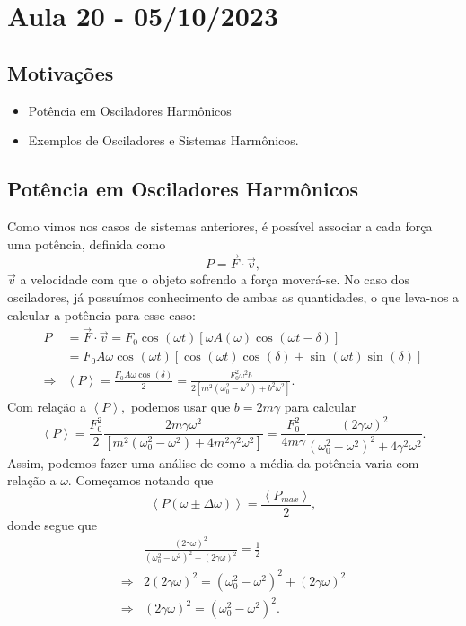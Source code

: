 \documentclass[PhysicsII/physicsII_notes.tex]{subfiles}
\begin{document}
\section{Aula 20 - 05/10/2023}
\subsection{Motivações}
\begin{itemize}
	\item Potência em Osciladores Harmônicos
	\item Exemplos de Osciladores e Sistemas Harmônicos.
\end{itemize}
\subsection{Potência em Osciladores Harmônicos}
Como vimos nos casos de sistemas anteriores, é possível associar a cada força uma potência, definida como
\[
	P = \vec{F}\cdot \vec{v},
\]
\(\vec{v}\) a velocidade com que o objeto sofrendo a força moverá-se. No caso dos osciladores, já possuímos conhecimento
de ambas as quantidades, o que leva-nos a calcular a potência para esse caso:
\begin{align*}
	P           & = \vec{F}\cdot \vec{v} = F_{0}\cos^{}{(\omega t)}[\omega A(\omega )\cos^{}{(\omega t-\delta )}]                                                 \\
	            & =F_{0}A\omega \cos^{}{(\omega t)}[\cos^{}{(\omega t)}\cos^{}{(\delta )} + \sin^{}{(\omega t)}\sin^{}{(\delta )}]                                \\
	\Rightarrow & \left< P\right> = \frac{F_{0}A\omega \cos^{}{(\delta )}}{2} = \frac{F_{0}^{2}\omega^{2}b}{2[m^{2}(\omega_{0}^{2}-\omega^{2})+b^{2}\omega^{2}]}.
\end{align*}
Com relação a \(\left< P \right>,\) podemos usar que \(b = 2m\gamma \) para calcular
\[
	\left< P \right> = \frac{F_{0}^{2}}{2}\frac{2m\gamma \omega^{2}}{[m^{2}(\omega_{0}^{2}-\omega^{2}) + 4m^{2}\gamma^{2}\omega^{2}]} = \frac{F_{0}^{2}}{4m\gamma }\frac{(2\gamma \omega )^{2}}{(\omega_{0}^{2}-\omega ^{2})^{2}+4\gamma^{2}\omega^{2}}.
\]
Assim, podemos fazer uma análise de como a média da potência varia com relação a \(\omega \). Começamos notando que
\[
	\left< P(\omega \pm \Delta \omega ) \right> = \frac{\left< P_{max} \right>}{2},
\]
donde segue que
\begin{align*}
	            & \frac{(2\gamma \omega )^{2}}{(\omega_{0}^{2}-\omega ^{2})^{2}+(2\gamma \omega )^{2}} = \frac{1}{2} \\
	\Rightarrow & 2(2\gamma \omega )^{2} = (\omega_{0}^{2}-\omega ^{2})^{2}+(2\gamma \omega )^{2}                    \\
	\Rightarrow & (2\gamma \omega )^{2}=(\omega_{0}^{2}-\omega ^{2})^{2}.
\end{align*}
\end{document}
